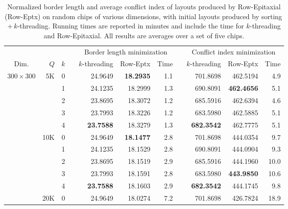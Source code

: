 \begin{table}[p!]\centering
\caption{\label{tab:reptx}
  Normalized border length and average conflict index of layouts produced by
  Row-Epitaxial (Row-Eptx) on random chips of various dimensions, with initial
  layouts produced by sorting\,+\,$k$-threading. Running times are reported
  in minutes and include the time for $k$-threading and Row-Epitaxial. All
  results are averages over a set of five chips.}
\footnotesize{
\begin{tabular*}{\hsize}{crrlrrrlrrr}
\vspace{1pt}
     &     &     & & \multicolumn{3}{c}{Border length minimization} & & \multicolumn{3}{c}{Conflict index minimization} \\ \cline{5-7} \cline{9-11}
\vspace{1pt}
Dim. & $Q$ & $k$ & & $k$-threading & Row-Eptx & Time                & & $k$-threading & Row-Eptx & Time \\
\hline
$300\times 300$ &  5K & 0 &   &      24.9649  & {\bf 18.2935} &  1.1 &  &      701.8698  &      462.5194  &   4.9 \\
                &     & 1 &   &      24.1235  &      18.2999  &  1.3 &  &      690.8091  & {\bf 462.4656} &   5.1 \\
                &     & 2 &   &      23.8695  &      18.3072  &  1.2 &  &      685.5916  &      462.6394  &   4.6 \\
                &     & 3 &   &      23.7993  &      18.3226  &  1.2 &  &      683.5980  &      462.5885  &   5.1 \\
                &     & 4 &   & {\bf 23.7588} &      18.3279  &  1.3 &  & {\bf 682.3542} &      462.7775  &   5.1 \\
\cline{2-11}
                & 10K & 0 &   &      24.9649  & {\bf 18.1477} &  2.8 &  &      701.8698  &      444.0354  &   9.7 \\
                &     & 1 &   &      24.1235  &      18.1529  &  2.8 &  &      690.8091  &      444.0904  &   9.3 \\
                &     & 2 &   &      23.8695  &      18.1519  &  2.9 &  &      685.5916  &      444.1960  &  10.0 \\
                &     & 3 &   &      23.7993  &      18.1591  &  2.8 &  &      683.5980  & {\bf 443.9850} &  10.6 \\
                &     & 4 &   & {\bf 23.7588} &      18.1603  &  2.9 &  & {\bf 682.3542} &      444.1745  &   9.8 \\
\cline{2-11}
                & 20K & 0 &   &      24.9649  &      18.0274  &  7.2 &  &      701.8698  &      426.7824  &  18.9 \\

\end{tabular*}}
\end{table}
